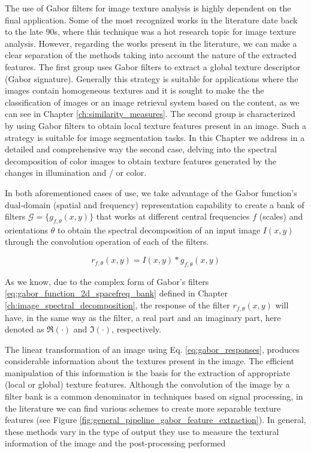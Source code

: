 The use of Gabor filters for image texture analysis is highly dependent on the final application. Some of the most recognized works in the literature date back to the late 90s, where this technique was a hot research topic for image texture analysis. However, regarding the works present in the literature, we can make a clear separation of the methods taking into account the nature of the extracted features. The first group uses Gabor filters to extract a global texture descriptor (Gabor signature). Generally this strategy is suitable for applications where the images contain homogeneous textures and it is sought to make the the classification of images or an image retrieval system based on the content, as we can see in Chapter \ref{ch:similarity_measures}. The second group is characterized by using Gabor filters to obtain local texture features present in an image. Such a strategy is suitable for image segmentation tasks. In this Chapter we address in a detailed and comprehensive way the second case, delving into the spectral decomposition of color images to obtain texture features generated by the changes in illumination and / or color.

In both aforementioned cases of use, we take advantage of the Gabor function's dual-domain (spatial and frequency) representation capability to create a bank of filters $\mathcal{G}=\{g_{f, \theta}(x, y) \}$ that works at different central frequencies $f$ (scales) and orientations $\theta$ to obtain the spectral decomposition of an input image $I(x, y)$ through the convolution operation of each of the filters. 

\begin{equation}\label{eq:gabor_responses}
    r_{f, \theta}(x,y) = I(x, y) \ast g_{f, \theta}(x,y)
\end{equation}

As we know, due to the complex form of Gabor's filters \ref{eq:gabor_function_2d_spacefreq_bank} defined in Chapter \ref{ch:image_spectral_decomposition}, the response of the filter $r_{f,\theta}(x, y)$ will have, in the same way as the filter, a real part and an imaginary part, here denoted as $\Re{(\cdot)}$ and $\Im{(\cdot)}$, respectively.

The linear transformation of an image using Eq. \eqref{eq:gabor_responses}, produces considerable information about the textures present in the image. The efficient manipulation of this information is the basis for the extraction of appropriate (local or global) texture features. Although the convolution of the image by a filter bank is a common denominator in techniques based on signal processing, in the literature we can find various schemes to create more separable texture features (see Figure \ref{fig:general_pipeline_gabor_feature_extraction}). In general, these methods vary in the type of output they use to measure the textural information of the image and the post-processing performed

